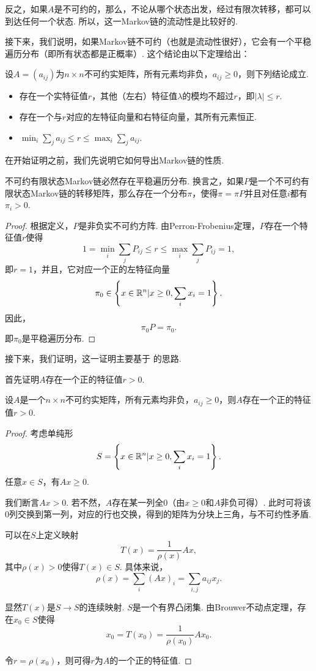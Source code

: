 反之，如果$A$是不可约的，那么，不论从哪个状态出发，经过有限次转移，都可以到达任何一个状态. 所以，这一Markov链的流动性是比较好的.

接下来，我们说明，如果Markov链不可约（也就是流动性很好），它会有一个平稳遍历分布（即所有状态都是正概率）. 这个结论由以下定理给出：

\begin{theorem}\label{thm:perron-frobenius}
    设$A=(a_{ij})$为$n\times n$不可约实矩阵，所有元素均非负，$a_{ij}\geq 0$，则下列结论成立.
    \begin{itemize}
        \item 存在一个实特征值$r$，其他（左右）特征值$\lambda$的模均不超过$r$，即$|\lambda|\leq r$.
        \item 存在一个与$r$对应的左特征向量和右特征向量，其所有元素恒正.
        \item $\min_i\sum_{j}a_{ij}\leq r\leq \max_i\sum_j a_{ij}$.
    \end{itemize}
\end{theorem}

在开始证明之前，我们先说明它如何导出Markov链的性质. 

\begin{corollary}
    不可约有限状态Markov链必然存在平稳遍历分布. 换言之，如果$P$是一个不可约有限状态Markov链的转移矩阵，那么存在一个分布$\pi$，使得$\pi=\pi P$并且对任意$i$都有$\pi_{i}>0$.
\end{corollary}
\begin{proof}
    根据定义，$P$是非负实不可约方阵. 由Perron-Frobenius定理，$P$存在一个特征值$r$使得
    \[1=\min_i\sum_jP_{ij}\leq r\le\max_i\sum_j P_{ij}=1,\]
    即$r=1$，并且，它对应一个正的左特征向量
    \[\pi_0\in \left\{x\in\mathbb{R}^n|x\geq 0,\sum_ix_i=1\right\}.\]
    因此，
    \[\pi_0 P = \pi_0.\]
    即$\pi_0$是平稳遍历分布. 
\end{proof}

接下来，我们证明，这一证明主要基于 \cite{debreuNonnegativeSquareMatrices1953} 的思路. 

首先证明$A$存在一个正的特征值$r>0$.

\begin{lemma}\label{lemma:positive-eigenvalue}
    设$A$是一个$n\times n$不可约实矩阵，所有元素均非负，$a_{ij}\geq 0$，则$A$存在一个正的特征值$r>0$.
\end{lemma}
\begin{proof}
考虑单纯形
\[S=\left\{x\in\mathbb{R}^n|x\geq 0,\sum_i x_i=1\right\}.\]
任意$x\in S$，有$Ax\geq 0$. 

我们断言$Ax>0$. 若不然，$A$存在某一列全$0$（由$x\geq 0$和$A$非负可得）. 此时可将该$0$列交换到第一列，对应的行也交换，得到的矩阵为分块上三角，与不可约性矛盾.

可以在$S$上定义映射
\[T(x) = \frac1{\rho(x)}Ax,\]
其中$\rho(x) > 0$使得$T(x)\in S$. 具体来说，
\[\rho(x) = \sum_i (Ax)_i = \sum_{i,j} a_{ij}x_j.\]

显然$T(x)$是$S\to S$的连续映射. $S$是一个有界凸闭集. 由Brouwer不动点定理，存在$x_0\in S$使得
\[x_0 = T(x_0)=\frac1{\rho(x_0)}Ax_0.\]

令$r=\rho(x_0)$，则可得$r$为$A$的一个正的特征值.
\end{proof}

